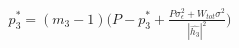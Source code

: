 \documentclass[preview]{standalone}
\begin{document}
\begin{align*}
p_3^\ast = \left(m_3 - 1\right) \bigg( P - p_3^\ast + \frac{P \sigma_\epsilon^2 + W_{tot} \sigma^2}{\left|\hat{h_3}\right|^2} \bigg)
\end{align*}
\end{document}
